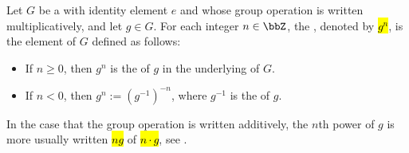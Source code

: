 \begin{definition} \label{definition:power_of_a_group_element_by_an_integer_multiple_of_an_abelian_group_element_by_an_integer}
Let $G$ be a  with identity element $e$ and whose group operation is written multiplicatively, and let $g \in G$. For each integer $n \in \bbZ$, the , denoted by \hl{$g^n$}, is the element of $G$ defined as follows:
\begin{itemize}
    \item If $n \geq 0$, then $g^n$ is the  of $g$ in the underlying  of $G$.
    \item If $n < 0$, then $g^n := (g^{-1})^{-n}$, where $g^{-1}$ is the  of $g$.
\end{itemize}
In the case that the group operation is written additively, the $n$th power of $g$ is more usually written \hl{$ng$} of \hl{$n \cdot g$}, see .
\end{definition}